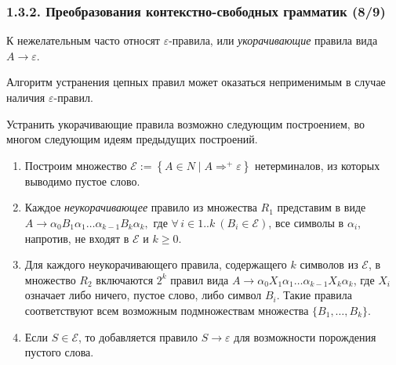 \documentclass[mathserif,12pt,aspectratio=169]{beamer}
\def\emразделенной{\em разделенной}
\renewcommand{\index}[1]{}
\def\em#1{\it\color{blue}#1}
\def\odmkey#1#2{{\it\color{red} #1}\index{#2}}
\def\Set#1#2{\left\{ #1 \mid #2 \right\}}
\def\Assign{\operatorname{:=}}
\def\A#1#2{\forall\,#1\ \left(#2\right)}
\def\Tuple#1#2#3{{#1}_{#2},\dots,{#1}_{#3}}
\let\cal\mathcal
\let\ge\geqslant
\begin{document}
\begin{frame}
\frametitle{1.3.2. Преобразования контекстно-свободных грамматик (8/9)}

К нежелательным часто относят $\varepsilon$-правила,
или \odmkey{укорачивающие}{Правило!укорачивающее} правила вида $A\to\varepsilon$.

\begin{remark}
Алгоритм устранения цепных правил может оказаться
неприменимым в случае наличия $\varepsilon$-правил.
\end{remark}

Устранить укорачивающие правила возможно следующим
построением, во многом следующим идеям предыдущих построений. 
 
\begin{enumerate}
\item Построим
множество 
$\cal{E}\Assign\Set{A\in N}{A\Rightarrow^+ \varepsilon}$
нетерминалов, из которых выводимо
пустое слово.
\item Каждое {\em неукорачивающее} 
правило из множества $R_1$ представим в виде\\ 
$A\to \alpha_0 B_1 \alpha_1 \dots
 \alpha_{k-1}B_k\alpha_k,$
где $\A{i\in 1..k}{B_i\in \cal{E}}$, 
все символы в $\alpha_i$, напротив,  
не входят в $\cal{E}$ и $k\ge 0$.
\item Для каждого неукорачивающего правила,
содержащего $k$ символов из $\cal{E}$,
в множество $R_2$ включаются  $2^k$
правил вида
$A\to \alpha_0 X_1 \alpha_1 \dots \alpha_{k-1}X_k\alpha_k$,
где $X_i$ означает либо ничего, пустое слово, либо
символ $B_i$.
Такие правила соответствуют  
всем возможным подмножествам множества 
$\{\Tuple{B}{1}{k}\}$.
\item Если $S\in\cal{E}$, то добавляется правило
$S\to \varepsilon$ для возможности порождения пустого слова.
\end{enumerate}

\end{frame}
\end{document}
